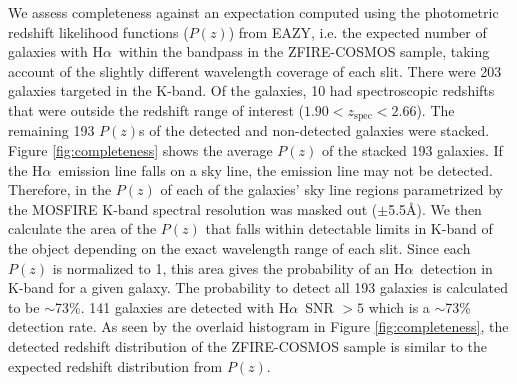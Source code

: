 \documentclass[iop]{emulateapj}
\newcommand{\Halpha}{H$\alpha$}
\newcommand{\around}{$\sim$}
\newcommand{\zspec}{$z_{\mathrm{spec}}$}
\begin{document}
We assess completeness against an expectation computed using the photometric redshift likelihood functions ($P(z)$) from EAZY, i.e. the  expected number of galaxies with \Halpha\ within the bandpass in the ZFIRE-COSMOS sample, taking account of the slightly different wavelength coverage of each slit. 
There were 203 galaxies targeted in the K-band. Of the galaxies, 10 had spectroscopic redshifts that were outside the redshift range of interest ($1.90<$\zspec$<2.66$).
The remaining 193 $P(z)$s of the detected and non-detected galaxies were stacked. 
Figure \ref{fig:completeness} shows the average $P(z)$ of the stacked 193 galaxies. 
If the \Halpha\ emission line falls on a sky line, the emission line may not be detected. Therefore, in the $P(z)$ of each of the galaxies' sky line regions parametrized by the MOSFIRE K-band spectral resolution was masked out ($\pm$5.5\AA).  
We then calculate the area of the $P(z)$ that falls within detectable limits in K-band of the object depending on the exact wavelength range of each slit.  
Since each $P(z)$ is normalized to 1, this area gives the probability of an \Halpha\ detection in K-band for a given galaxy. 
The probability to detect all 193 galaxies is calculated to be \around73\%. 
141 galaxies are detected with \Halpha\ SNR $>5$ which is a \around73\% detection rate. 
As seen by the overlaid histogram in Figure \ref{fig:completeness}, the detected redshift distribution of the ZFIRE-COSMOS sample is similar to the expected redshift distribution from $P(z)$.
\end{document}
